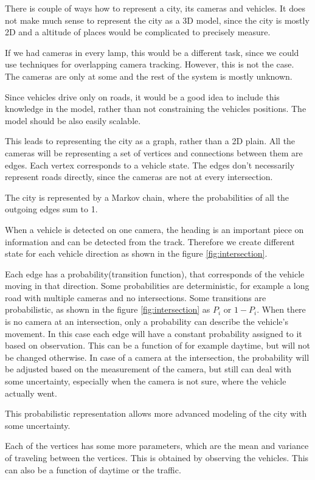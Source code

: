 \documentclass[a4paper,12pt,titlepage, twoside]{article}
\numberwithin{figure}{section}
\begin{document}
There is couple of ways how to represent a city, its cameras and vehicles. It does not make much sense to represent the city as a 3D model, since the city is mostly 2D and a altitude of places would be complicated to precisely measure. 

If we had cameras in every lamp, this would be a different task, since we could use techniques for overlapping camera tracking. However, this is not the case. The cameras are only at some and the rest of the system is mostly unknown. 

Since vehicles drive only on roads, it would be a good idea to include this knowledge in the model, rather than not constraining the vehicles positions. The model should be also easily scalable. 

This leads to representing the city as a graph, rather than a 2D plain. All the cameras will be representing a set of vertices and connections between them are edges. Each vertex corresponds to a vehicle state. The edges don't necessarily represent roads directly, since the cameras are not at every intersection. 

The city is represented by a Markov chain, where the probabilities of all the outgoing edges sum to 1.

When a vehicle is detected on one camera, the heading is an important piece on information and can be detected from the track. Therefore we create different state for each vehicle direction as shown in the figure \ref{fig:intersection}. 

Each edge has a probability(transition function), that corresponds of the vehicle moving in that direction. Some probabilities are deterministic, for example a long road with multiple cameras and no intersections. Some transitions are probabilistic, as shown in the figure \ref{fig:intersection} as $P_i$ or $1 - P_i$. When there is no camera at an intersection, only a probability can describe the vehicle's movement. In this case each edge will have a constant probability assigned to it based on observation. This can be a function of for example daytime, but will not be changed otherwise. In case of a camera at the intersection, the probability will be adjusted based on the measurement of the camera, but still can deal with some uncertainty, especially when the camera is not sure, where the vehicle actually went. 

This probabilistic representation allows more advanced modeling of the city with some uncertainty.

Each of the vertices has some more parameters, which are the mean and variance of traveling between the vertices. This is obtained by observing the vehicles. This can also be a function of daytime or the traffic.
\end{document}
